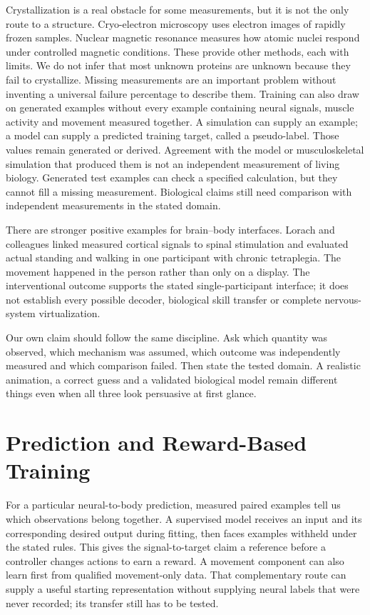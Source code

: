 Crystallization is a real obstacle for some measurements, but it is not the
only route to a structure. Cryo-electron microscopy uses electron images of rapidly frozen samples. Nuclear magnetic resonance measures how atomic nuclei respond under controlled magnetic conditions. These provide other methods, each with limits. We do not infer that most
unknown proteins are unknown because they fail to crystallize.\cite{pdbmethods}
Missing measurements are an important problem without inventing a universal
failure percentage to describe them.
Training can also draw on generated examples without every example containing neural signals, muscle activity and movement measured together. A simulation can supply an example; a model can supply a predicted training target, called a pseudo-label. Those values remain generated or derived. Agreement with the model or musculoskeletal simulation that produced them is not an independent measurement of living biology. Generated test examples can check a specified calculation, but they cannot fill a missing measurement. Biological claims still need comparison with independent measurements in the stated domain.

There are stronger positive examples for brain--body interfaces. Lorach and
colleagues linked measured cortical signals to spinal stimulation and evaluated
actual standing and walking in one participant with chronic tetraplegia. The
movement happened in the person rather than only on a display.\cite{lorach2023}
The interventional outcome supports the stated single-participant interface;
it does not establish every possible decoder, biological skill transfer or
complete nervous-system virtualization.

Our own claim should follow the same discipline. Ask which quantity was observed,
which mechanism was assumed, which outcome was independently measured and which
comparison failed. Then state the tested domain. A realistic animation, a
correct guess and a validated biological model remain different things even
when all three look persuasive at first glance.


\section{Prediction and Reward-Based Training}

For a particular neural-to-body prediction, measured paired examples tell us which observations belong together. A supervised model receives an input and its corresponding desired output during fitting, then faces examples withheld under the stated rules. This gives the signal-to-target claim a reference before a controller changes actions to earn a reward. A movement component can also learn first from qualified movement-only data. That complementary route can supply a useful starting representation without supplying neural labels that were never recorded; its transfer still has to be tested.

